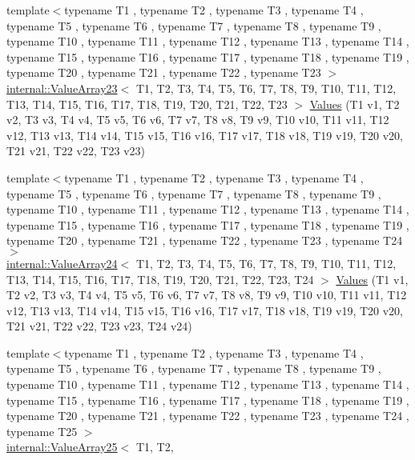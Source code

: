 \begin{DoxyCompactItemize}
\item 
{\footnotesize template$<$typename T1 , typename T2 , typename T3 , typename T4 , typename T5 , typename T6 , typename T7 , typename T8 , typename T9 , typename T10 , typename T11 , typename T12 , typename T13 , typename T14 , typename T15 , typename T16 , typename T17 , typename T18 , typename T19 , typename T20 , typename T21 , typename T22 , typename T23 $>$ }\\\hyperlink{classtesting_1_1internal_1_1ValueArray23}{internal\-::\-Value\-Array23}$<$ \-T1, \-T2, \*
\-T3, \-T4, \-T5, \-T6, \-T7, \-T8, \-T9, \*
\-T10, \-T11, \-T12, \-T13, \-T14, \-T15, \*
\-T16, \-T17, \-T18, \-T19, \-T20, \-T21, \*
\-T22, \-T23 $>$ \hyperlink{namespacetesting_a820991f1c28518a0c218176bd7192de8}{\-Values} (\-T1 v1, \-T2 v2, \-T3 v3, \-T4 v4, \-T5 v5, \-T6 v6, \-T7 v7, \-T8 v8, \-T9 v9, \-T10 v10, \-T11 v11, \-T12 v12, \-T13 v13, \-T14 v14, \-T15 v15, \-T16 v16, \-T17 v17, \-T18 v18, \-T19 v19, \-T20 v20, \-T21 v21, \-T22 v22, \-T23 v23)
\item 
{\footnotesize template$<$typename T1 , typename T2 , typename T3 , typename T4 , typename T5 , typename T6 , typename T7 , typename T8 , typename T9 , typename T10 , typename T11 , typename T12 , typename T13 , typename T14 , typename T15 , typename T16 , typename T17 , typename T18 , typename T19 , typename T20 , typename T21 , typename T22 , typename T23 , typename T24 $>$ }\\\hyperlink{classtesting_1_1internal_1_1ValueArray24}{internal\-::\-Value\-Array24}$<$ \-T1, \-T2, \*
\-T3, \-T4, \-T5, \-T6, \-T7, \-T8, \-T9, \*
\-T10, \-T11, \-T12, \-T13, \-T14, \-T15, \*
\-T16, \-T17, \-T18, \-T19, \-T20, \-T21, \*
\-T22, \-T23, \-T24 $>$ \hyperlink{namespacetesting_a74b2375fe8c3c685e6f7b0b6a9b61009}{\-Values} (\-T1 v1, \-T2 v2, \-T3 v3, \-T4 v4, \-T5 v5, \-T6 v6, \-T7 v7, \-T8 v8, \-T9 v9, \-T10 v10, \-T11 v11, \-T12 v12, \-T13 v13, \-T14 v14, \-T15 v15, \-T16 v16, \-T17 v17, \-T18 v18, \-T19 v19, \-T20 v20, \-T21 v21, \-T22 v22, \-T23 v23, \-T24 v24)
\item 
{\footnotesize template$<$typename T1 , typename T2 , typename T3 , typename T4 , typename T5 , typename T6 , typename T7 , typename T8 , typename T9 , typename T10 , typename T11 , typename T12 , typename T13 , typename T14 , typename T15 , typename T16 , typename T17 , typename T18 , typename T19 , typename T20 , typename T21 , typename T22 , typename T23 , typename T24 , typename T25 $>$ }\\\hyperlink{classtesting_1_1internal_1_1ValueArray25}{internal\-::\-Value\-Array25}$<$ \-T1, \-T2, \*

\end{DoxyCompactItemize}
